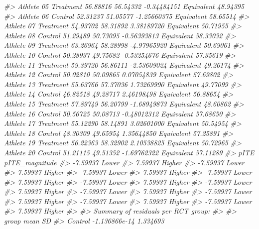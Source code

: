 \documentclass[
]{book}
\newenvironment{Shaded}{\begin{snugshade}}{\end{snugshade}}
\newcommand{\CommentTok}[1]{\textcolor[rgb]{0.56,0.35,0.01}{\textit{#1}}}
\begin{document}
\begin{Shaded}
\begin{Highlighting}[]
\CommentTok{\#>  Athlete 05 Treatment 56.88816  56.54332 {-}0.34484151 Equivalent       48.94395}
\CommentTok{\#>  Athlete 06   Control 52.31237  51.05577 {-}1.25660375 Equivalent       58.65514}
\CommentTok{\#>  Athlete 07 Treatment 54.93702  58.31892  3.38189720 Equivalent       50.71955}
\CommentTok{\#>  Athlete 08   Control 51.29489  50.73095 {-}0.56393813 Equivalent       58.33032}
\CommentTok{\#>  Athlete 09 Treatment 63.26964  58.28998 {-}4.97965920 Equivalent       50.69061}
\CommentTok{\#>  Athlete 10   Control 50.28937  49.75682 {-}0.53254676 Equivalent       57.35619}
\CommentTok{\#>  Athlete 11 Treatment 59.39720  56.86111 {-}2.53609024 Equivalent       49.26174}
\CommentTok{\#>  Athlete 12   Control 50.02810  50.09865  0.07054839 Equivalent       57.69802}
\CommentTok{\#>  Athlete 13 Treatment 55.63766  57.37036  1.73269990 Equivalent       49.77099}
\CommentTok{\#>  Athlete 14   Control 46.82518  49.28717  2.46198498 Equivalent       56.88654}
\CommentTok{\#>  Athlete 15 Treatment 57.89749  56.20799 {-}1.68949873 Equivalent       48.60862}
\CommentTok{\#>  Athlete 16   Control 50.56725  50.08713 {-}0.48012312 Equivalent       57.68650}
\CommentTok{\#>  Athlete 17 Treatment 55.12290  58.14891  3.02601000 Equivalent       50.54954}
\CommentTok{\#>  Athlete 18   Control 48.30309  49.65954  1.35644850 Equivalent       57.25891}
\CommentTok{\#>  Athlete 19 Treatment 56.22363  58.32902  2.10538825 Equivalent       50.72965}
\CommentTok{\#>  Athlete 20   Control 51.21115  49.51352 {-}1.69762322 Equivalent       57.11289}
\CommentTok{\#>      pITE pITE\_magnitude}
\CommentTok{\#>  {-}7.59937          Lower}
\CommentTok{\#>   7.59937         Higher}
\CommentTok{\#>  {-}7.59937          Lower}
\CommentTok{\#>   7.59937         Higher}
\CommentTok{\#>  {-}7.59937          Lower}
\CommentTok{\#>   7.59937         Higher}
\CommentTok{\#>  {-}7.59937          Lower}
\CommentTok{\#>   7.59937         Higher}
\CommentTok{\#>  {-}7.59937          Lower}
\CommentTok{\#>   7.59937         Higher}
\CommentTok{\#>  {-}7.59937          Lower}
\CommentTok{\#>   7.59937         Higher}
\CommentTok{\#>  {-}7.59937          Lower}
\CommentTok{\#>   7.59937         Higher}
\CommentTok{\#>  {-}7.59937          Lower}
\CommentTok{\#>   7.59937         Higher}
\CommentTok{\#>  {-}7.59937          Lower}
\CommentTok{\#>   7.59937         Higher}
\CommentTok{\#>  {-}7.59937          Lower}
\CommentTok{\#>   7.59937         Higher}
\CommentTok{\#> }
\CommentTok{\#> Summary of residuals per RCT group:}
\CommentTok{\#> }
\CommentTok{\#>      group          mean       SD}
\CommentTok{\#>    Control {-}1.136866e{-}14 1.334693}

\end{Highlighting}
\end{Shaded}
\end{document}
